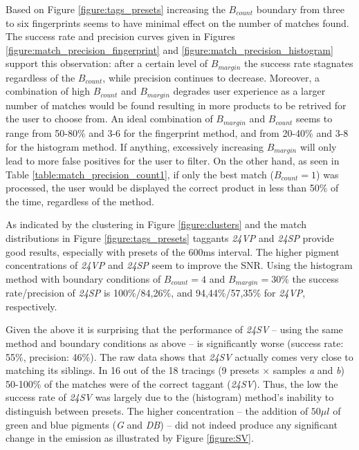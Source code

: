 \documentclass[thesis.tex]{subfiles}
\begin{document}
Based on Figure \ref{figure:tags_presets} increasing the $B_{count}$ boundary from three to six fingerprints seems to have minimal effect on the number of matches found. The success rate and precision curves given in Figures \ref{figure:match_precision_fingerprint} and \ref{figure:match_precision_histogram} support this observation: after a certain level of $B_{margin}$ the success rate stagnates regardless of the $B_{count}$, while precision continues to decrease. Moreover, a combination of high $B_{count}$ and $B_{margin}$ degrades user experience as a larger number of matches would be found resulting in more products to be retrived for the user to choose from. An ideal combination of $B_{margin}$ and $B_{count}$ seems to range from 50-80\% and 3-6 for the fingerprint method, and from 20-40\% and 3-8 for the histogram method. If anything, excessively increasing $B_{margin}$ will only lead to more false positives for the user to filter. On the other hand, as seen in Table \ref{table:match_precision_count1}, if only the best match ($B_{count} = 1$) was processed, the user would be displayed the correct product in less than 50\% of the time, regardless of the method.

As indicated by the clustering in Figure \ref{figure:clusters} and the match distributions in Figure \ref{figure:tags_presets} taggants \emph{24VP} and \emph{24SP} provide good results, especially with presets of the 600ms interval. The higher pigment concentrations of \emph{24VP} and \emph{24SP} seem to improve the SNR. Using the histogram method with boundary conditions of $B_{count} = 4$ and $B_{margin} = 30\%$ the success rate/precision of \emph{24SP} is 100\%/84,26\%, and 94,44\%/57,35\% for \emph{24VP}, respectively.
\enlargethispage{1\baselineskip}

Given the above it is surprising that the performance of \emph{24SV} -- using the same method and boundary conditions as above -- is significantly worse (success rate: 55\%, precision: 46\%). The raw data shows that \emph{24SV} actually comes very close to matching its siblings. In 16 out of the 18 tracings (9 presets $\times$ samples \emph{a} and \emph{b}) 50-100\% of the matches were of the correct taggant (\emph{24SV}). Thus, the low the success rate of \emph{24SV} was largely due to the (histogram) method's inability to distinguish between presets. The higher concentration -- the addition of $50\mu l$ of green and blue pigments (\emph{G} and \emph{DB}) -- did not indeed produce any significant change in the emission as illustrated by Figure \ref{figure:SV}.
\end{document}
